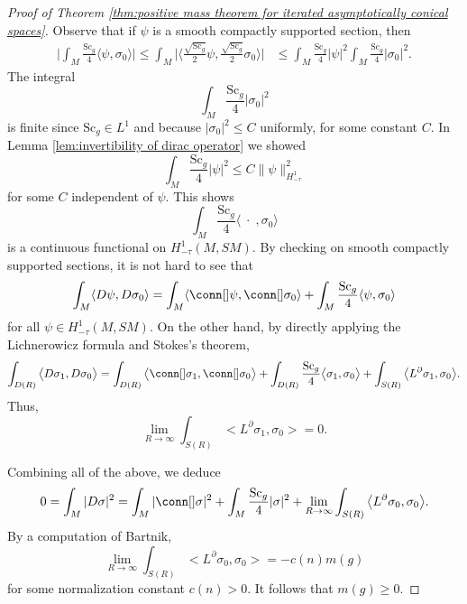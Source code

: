 \documentclass[12pt, reqno]{amsart}
\theoremstyle{plain} %
\theoremstyle{definition}
\theoremstyle{remark}
\numberwithin{equation}{section}
\newcommand{\norm}[1]{\lVert #1 \rVert}
\newcommand{\pnorm}[1]{| #1 |}
\newcommand{\abs}[1]{\lvert #1 \rvert}
\newcommand{\Sc}{\mathrm{Sc}}
\newcommand{\inner}[1]{\langle #1 \rangle}
\begin{document}
\begin{proof}[Proof of Theorem \ref{thm:positive mass theorem for iterated asymptotically conical spaces}]
    Observe that if \(\psi\) is a smooth compactly supported section, then
    \begin{align*}
        \abs{\int_M \frac{\Sc_g}{4} \inner{\psi, \sigma_0}} \leq \int_M \abs{\inner{\frac{\sqrt{\Sc_g}}{2} \psi, \frac{\sqrt{\Sc_g}}{2}\sigma_0}} &\leq \int_M \frac{\Sc_g}{4}\pnorm{\psi}^2 \int_M \frac{\Sc_g}{4} \pnorm{\sigma_0}^2.
    \end{align*}
    The integral
    \begin{equation*}
        \int_M \frac{\Sc_g}{4} \pnorm{\sigma_0}^2
    \end{equation*}
    is finite since \(\Sc_g \in L^1\) and because \(\pnorm{{\sigma_0}}^2 \leq C\) uniformly, for some constant \(C\).
    In Lemma \ref{lem:invertibility of dirac operator} we showed
    \begin{equation*}
        \int_M \frac{\Sc_g}{4}\pnorm{\psi}^2 \leq C\norm{\psi}_{H_{-\tau}^1}^2
    \end{equation*}
    for some \(C\) independent of \(\psi\).
    This shows
    \begin{equation*}
        \int_M \frac{\Sc_g}{4} \inner{\;\cdot\;, \sigma_0}
    \end{equation*}
    is a continuous functional on \(H_{-\tau}^1(M, SM)\).
    By checking on smooth compactly supported sections, it is not hard to see that
    \begin{equation*}
        \int_M \inner{D\psi, D\sigma_0} = \int_M \inner{\conn[] \psi, \conn[] \sigma_0} + \int_M \frac{\Sc_g}{4} \inner{\psi, \sigma_0}
    \end{equation*}
    for all \(\psi \in H_{-\tau}^1(M, SM)\).
    On the other hand, by directly applying the Lichnerowicz formula and Stokes's theorem,
    \begin{equation*}
        \int_{D(R)} \big< D\sigma_1, D\sigma_0 \big> = \int_{D(R)} \big< \conn[]\sigma_1, \conn[]\sigma_0 \big> + \int_{D(R)} \frac{\Sc_g}{4} \big< \sigma_1, \sigma_0 \big> + \int_{S(R)} \big< L^\partial \sigma_1, \sigma_0 \big>.
    \end{equation*}
    Thus,
    \begin{equation*}
        \lim_{R \to \infty} \int_{S(R)} \big< L^\partial \sigma_1, \sigma_0 \big> = 0.
    \end{equation*}

    Combining all of the above, we deduce
    \begin{equation*}
        0 = \int_M \pnorm{D\sigma}^2 = \int_M \pnorm{\conn[] \sigma}^2 + \int_M \frac{\Sc_g}{4} \pnorm{\sigma}^2 + \lim_{R \to \infty} \int_{S(R)} \big< L^\partial \sigma_0, \sigma_0 \big>.
    \end{equation*}
    By a computation of Bartnik,
    \begin{equation*}
        \lim_{R \to \infty} \int_{S(R)} \big< L^\partial \sigma_0, \sigma_0 \big> = -c(n)m(g)
    \end{equation*}
    for some normalization constant \(c(n) > 0\).
    It follows that \(m(g) \geq 0\).


\end{proof}
\end{document}
